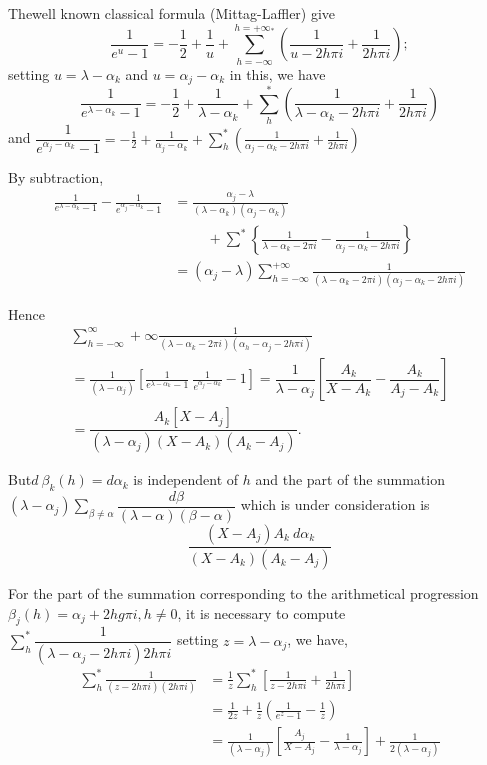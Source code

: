 The\pageoriginale well known classical formula (Mittag-Laffler) give
$$
\frac{1}{e^u - 1} = - \frac{1}{2} + \frac{1}{u} + \sum^{h = +
  \infty_*}_{h = -\infty}\left(\frac{1}{u - 2h\pi i} + \frac{1}{2h \pi i}\right); 
$$
setting $u = \lambda - \alpha_k$ and $u = \alpha_j - \alpha_k$ in this, we have
$$
\frac{1}{e^{\lambda - \alpha_k}-1} = - \frac{1}{2} +
\frac{1}{\lambda - \alpha_k} + \sum^*_h \left(\frac{1}{\lambda - \alpha_k -
  2h\pi i} + \frac{1}{2h \pi i}\right) 
$$
and $\dfrac{1}{e^{\alpha_j - \alpha_k} - 1} = - \frac{1}{2} +
\frac{1}{\alpha_j - \alpha_k} + \sum\limits^*_h \left(\frac{1}{\alpha_j -
  \alpha_k - 2h\pi i} + \frac{1}{2h \pi i}\right)$ 

By subtraction,
\begin{align*}
  \frac{1}{e^{\lambda - \alpha_k}-1} - \frac{1}{e^{\alpha_j -
      \alpha_k}-1} & = \frac{\alpha_j - \lambda}{(\lambda -
    \alpha_k)(\alpha_j - \alpha_k)} \\
  & \hspace{1cm}+ \sum^* \left\{ \frac{1}{\lambda -
    \alpha_k - 2 \pi i} - \frac{1}{\alpha_j - \alpha_k - 2h \pi
    i}\right\}\\ 
  & = (\alpha_j - \lambda) \sum_{h = - \infty}^{+
    \infty}\frac{1}{(\lambda - \alpha_k - 2\pi i) (\alpha_j - \alpha_k
    - 2h \pi i)} 
\end{align*}

Hence 
\begin{multline*}
  \sum\limits_{h=-\infty}^\infty+ \infty \frac{1}{(\lambda - \alpha_k
  - 2\pi i) (\alpha_h - \alpha_j - 2h \pi i)}\\  
  = \frac{1}{(\lambda
  -\alpha_j)} \left[ \frac{1}{e^{\lambda - \alpha_k} -1} ~
  \frac{1}{e^{\alpha_j - \alpha_k}} -1\right] 
  = \dfrac{1}{\lambda -
  \alpha_j} \left[ \dfrac{A_k}{X - A_k} - \dfrac{A_k}{{A_j - A_k}}\right]\\
  = \dfrac{A_k[X-A_j]}{(\lambda - \alpha_j) (X-A_k)(A_k - A_j)}. 
\end{multline*}

But\pageoriginale $d ~ \beta_k (h) = d \alpha_k$ is independent of $h$ and the part
of the summation $(\lambda - \alpha_j) \sum\limits_{\beta \neq \alpha}
\dfrac{d \beta}{(\lambda - \alpha)(\beta - \alpha)}$ which is under
consideration is  
$$
\frac{(X - A_j) A_k ~ d \alpha_k}{(X- A_k) (A_k - A_j)}
$$

For the part of the summation corresponding to the arithmetical
progression $\beta_j (h) = \alpha_j + 2 hg \pi i, h \neq 0$, it is
necessary to compute $\sum\limits_h^* \dfrac{1}{(\lambda - \alpha_j -
  2 h \pi i) 2 h \pi i}$ setting $z = \lambda - \alpha_j$, we have, 
\begin{align*}
   \sum_h^* \frac{1}{(z-2h \pi i)(2h \pi i)}& = \frac{1}{z}\sum_h^*
  \left[\frac{1}{z - 2 h \pi i} + \frac{1}{2 h \pi i}\right]\\ 
  & =\frac{1}{2z} + \frac{1}{z} \left(\frac{1}{e^z -1} - \frac{1}{z}\right)\\
  & = \frac{1}{(\lambda - \alpha_j)} \left[ \frac{A_j}{X - A_j} -
    \frac{1}{\lambda - \alpha_j} \right] + \frac{1}{2(\lambda -
    \alpha_j)} 
\end{align*}

